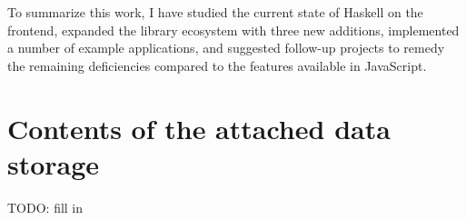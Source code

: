 \documentclass[english,odsaz]{fitthesis}
\begin{document}
To summarize this work, I have studied the current state of Haskell on the
frontend, expanded the library ecosystem with three new additions, implemented a
number of example applications, and suggested follow-up projects to remedy the
remaining deficiencies compared to the features available in JavaScript.

\makeatletter
\def\@openbib@code{\addcontentsline{toc}{chapter}{Bibliography}}
\makeatother


\begin{flushleft}

\end{flushleft}
\iftwoside\cleardoublepage\fi

\appendix
\appendixpage
\iftwoside\cleardoublepage\fi

\startcontents[chapters]
\iftwoside\cleardoublepage\fi

\chapter{Contents of the attached data storage}
\label{sec:org214d83f}
TODO: fill in
\end{document}
